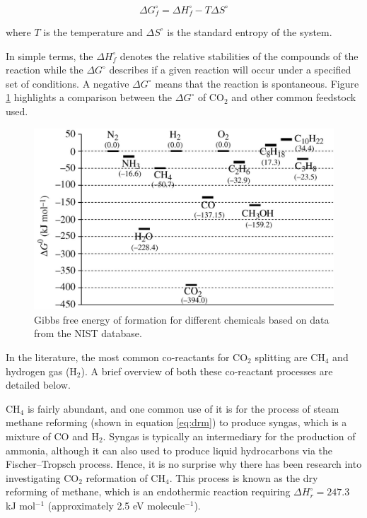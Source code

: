 \begin{equation}
    \Delta G^\circ_f = \Delta H^\circ_f - T \Delta S^\circ
    \label{eq:gibbs_free_energy_equation}
\end{equation}

where $T$ is the temperature and  $\Delta S^\circ$ is the standard entropy of the system.

In simple terms, the $\Delta H^\circ_f$ denotes the relative stabilities of the compounds of the reaction while the $\Delta G^\circ$ describes if a given reaction will occur under a specified set of conditions. A negative $\Delta G^\circ$ means that the reaction is spontaneous. Figure \ref{fig:co2_stability} highlights a comparison between the $\Delta G^\circ$ of CO$_2$ and other common feedstock used. 

\begin{figure}[h!]
	\centering
	\includegraphics[width=0.83\linewidth]{chapter_3/figures/co2_stability.jpg}
	\caption{Gibbs free energy of formation for different chemicals based on data from the NIST database. \cite{jiang_xiao_kuznetsov_edwards_2010}}
	\label{fig:co2_stability}
\end{figure} 

In the literature, the most common co-reactants for CO$_2$ splitting are CH$_4$ and hydrogen gas (H$_2$). A brief overview of both these co-reactant processes are detailed below.

CH$_4$ is fairly abundant, and one common use of it is for the process of steam methane reforming (shown in equation \ref{eq:drm}) to produce syngas, which is a mixture of CO and H$_2$. Syngas is typically an intermediary for the production of ammonia, although it can also used to produce liquid hydrocarbons via the Fischer–Tropsch process. Hence, it is no surprise why there has been research into investigating CO$_2$ reformation of CH$_4$. This process is known as the dry reforming of methane, which is an endothermic reaction requiring $\Delta H^\circ_r  = 247.3$ kJ mol$^{-1}$ (approximately 2.5 eV molecule$^{-1}$). 

